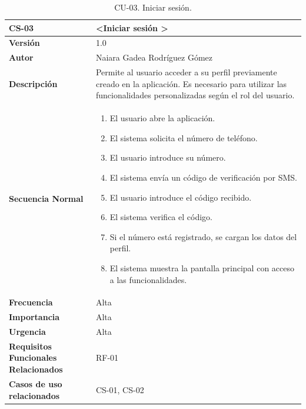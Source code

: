 \begin{table}[htbp] %
\centering
\begin{tabular}{ |m{3cm}|m{11cm}|  } 
\hline
\cellcolor[HTML]{B9E3F0}\centering\textbf{CS-03} & \cellcolor[HTML]{B9E3F0}\textbf{\textless Iniciar sesión \textgreater}\\

\hline
\cellcolor[HTML]{EFEFEF}\textbf{Versión}             & 1.0  \\
\hline
\cellcolor[HTML]{EFEFEF}\textbf{Autor}                & Naiara Gadea Rodríguez Gómez\\
\hline
\cellcolor[HTML]{EFEFEF}\textbf{Descripción}                & { Permite al usuario acceder a su perfil previamente creado en la aplicación. Es necesario para utilizar las funcionalidades personalizadas según el rol del usuario. }\\
\hline
\cellcolor[HTML]{EFEFEF}\textbf{Secuencia \newline Normal}                &                 
        \begin{enumerate}
            \item El usuario abre la aplicación.
            \item El sistema solicita el número de teléfono.
            \item El usuario introduce su número.
            \item El sistema envía un código de verificación por SMS.
            \item El usuario introduce el código recibido.
            \item El sistema verifica el código.
            \item Si el número está registrado, se cargan los datos del perfil.
            \item El sistema muestra la pantalla principal con acceso a las funcionalidades.
        \end{enumerate}\\
\hline
\cellcolor[HTML]{EFEFEF}\textbf{Frecuencia}                & Alta\\
\hline
\cellcolor[HTML]{EFEFEF}\textbf{Importancia}                & Alta\\
\hline
\cellcolor[HTML]{EFEFEF}\textbf{Urgencia}                & Alta\\
\hline
\cellcolor[HTML]{EFEFEF}\textbf{Requisitos Funcionales Relacionados}                & { RF-01 }\\
\hline
\cellcolor[HTML]{EFEFEF}\textbf{Casos de uso relacionados}                & { CS-01, CS-02 }\\
\hline
\end{tabular}
\caption{CU-03. Iniciar sesión.}
\end{table}


